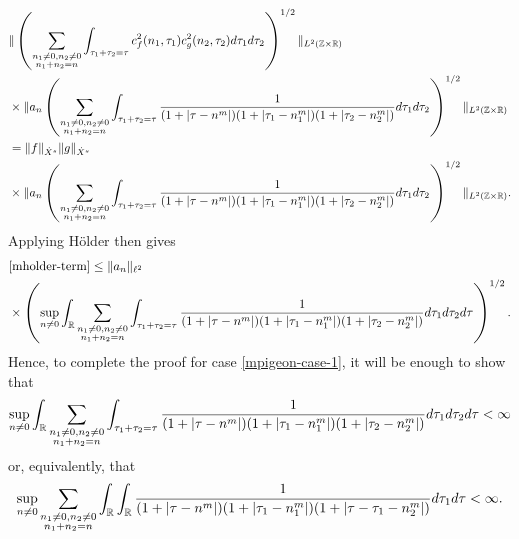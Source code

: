 %
%
\begin{align}
	\notag
		& \|\left( \sum_{\substack{n_1 \neq 0, n_2 \neq 0 \\n_1 +n_2 =n}}\int_{\tau_1 + \tau_2 = \tau} c_{f}^{2}(n_1, \tau_1)
		c_{g}^{2} (n_2, \tau_2) d \tau_1 d \tau_2 \right)^{1/2} \|_{L^{2}(\mathbb{Z} \times
		\mathbb{R})}
		\\
		\notag
		& \times  \|a_{n}
		\left( \sum_{\substack{n_1 \neq 0, n_2 \neq 0 \\n_1 +n_2
		=n}}\int_{\tau_1 + \tau_2 = \tau} \frac{1}{ (1 + | \tau - n^m |)(1 + |
		\tau_{1}-n_{1}^m |)(1 + | \tau_2 -n_{2}^m |)} d \tau_1 d \tau_2
		\right)^{1/2} \|_{L^2(\mathbb{Z} \times \mathbb{R})}
		\\
		\notag
		& = \|f\|_{\dot{X}^s} \|g\|_{\dot{X}^s}
		\\
		\label{mholder-term}
		& \times 
		\|a_{n}
		\left( \sum_{\substack{n_1 \neq 0, n_2 \neq 0 \\n_1 +n_2
		=n}}\int_{\tau_1 + \tau_2 = \tau} \frac{1}{ (1 + | \tau - n^m |)(1 + |
		\tau_{1}-n_{1}^m |)(1 + | \tau_2 -n_{2}^m |)} d \tau_1 d \tau_2
		\right)^{1/2} \|_{L^2(\mathbb{Z} \times \mathbb{R})}.
\end{align}
%
Applying H{\"o}lder then gives
%
%
\begin{equation*}
	\begin{split}
		& \eqref{mholder-term}
		 \le \| a_{n} \|_{\ell^2}
		\\
		& \times \left( \sup_{n \neq 0} \int_{\mathbb{R}}
		\sum_{\substack{n_1 \neq 0, n_2 \neq 0 \\n_1 +n_2 =n}} \int_{\tau_1 + \tau_2
		= \tau} \frac{1}{ (1 + | \tau - n^m |)(1 + |
		\tau_{1}-n_{1}^m |)(1 + | \tau_2 -n_{2}^m |)} d \tau_1 d \tau_2 d \tau
		\right)^{1/2}.
	\end{split}
\end{equation*}
%
%
Hence, to complete the proof for case \eqref{mpigeon-case-1}, it will be enough
to show that 
%
%
%
%
\begin{equation*}
	\begin{split}
		 \sup_{n \neq 0} \int_{\mathbb{R}}
		\sum_{\substack{n_1 \neq 0, n_2 \neq 0 \\n_1 +n_2 =n}} \int_{\tau_1 + \tau_2
		= \tau} \frac{1}{ (1 + | \tau - n^m |)(1 + |
		\tau_{1}-n_{1}^m |)(1 + | \tau_2 -n_{2}^m |)} d \tau_1 d \tau_2 d \tau <\infty
	\end{split}
\end{equation*}
%
%
or, equivalently, that
%
%
\begin{equation}
	\label{m12g}
	\begin{split}
		\sup_{n \neq 0} \sum_{\substack{n_1 \neq 0, n_2 \neq 0 \\n_1 +n_2 =n}} \int_{\mathbb{R}}
		\int_{\mathbb{R}}  \frac{1}{(1 + | \tau - n^m |)(1 + | \tau_1 - n_{1}^m |)(1 + | \tau - \tau_1 -
		n_2^m |)} d \tau_1 d \tau < \infty.
	\end{split}
\end{equation}
